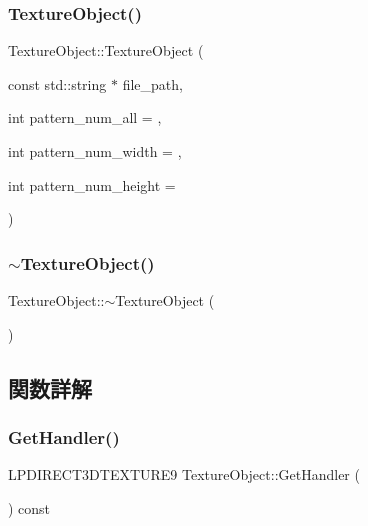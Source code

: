 \subsubsection{\texorpdfstring{Texture\+Object()}{TextureObject()}}
{\footnotesize\ttfamily Texture\+Object\+::\+Texture\+Object (\begin{DoxyParamCaption}\item[{const std\+::string $\ast$}]{file\+\_\+path,  }\item[{int}]{pattern\+\_\+num\+\_\+all = {},  }\item[{int}]{pattern\+\_\+num\+\_\+width = {},  }\item[{int}]{pattern\+\_\+num\+\_\+height = {} }\end{DoxyParamCaption})}

\mbox{\label{class_texture_object_aeed25fa5ca8e892b96145f4a649e090a}} 
\subsubsection{\texorpdfstring{$\sim$\+Texture\+Object()}{~TextureObject()}}
{\footnotesize\ttfamily Texture\+Object\+::$\sim$\+Texture\+Object (\begin{DoxyParamCaption}{ }\end{DoxyParamCaption})\hspace{0.3cm}{\ttfamily [virtual]}}



\subsection{関数詳解}
\mbox{\label{class_texture_object_a1b6c93f36e03686f7198b93355c73c8a}} 
\subsubsection{\texorpdfstring{Get\+Handler()}{GetHandler()}}
{\footnotesize\ttfamily L\+P\+D\+I\+R\+E\+C\+T3\+D\+T\+E\+X\+T\+U\+R\+E9 Texture\+Object\+::\+Get\+Handler (\begin{DoxyParamCaption}{ }\end{DoxyParamCaption}) const\hspace{0.3cm}{\ttfamily [inline]}}

